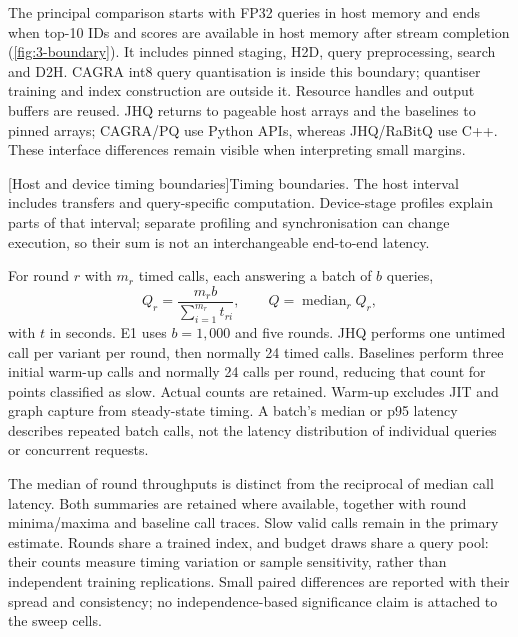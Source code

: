 The principal comparison starts with FP32 queries in host memory and ends
when top-10 IDs and scores are available in host memory after stream
completion (\cref{fig:3-boundary}). It includes pinned staging, H2D,
query preprocessing, search and D2H. CAGRA int8 query quantisation is inside
this boundary; quantiser training and index construction are outside it.
Resource handles and output buffers are reused. JHQ returns to pageable
host arrays and the baselines to pinned arrays; CAGRA/PQ use Python APIs,
whereas JHQ/RaBitQ use C++. These interface differences remain visible when
interpreting small margins.

\par\medskip\noindent\begin{minipage}{\linewidth}
\centering\captionsetup{hypcap=false}
\resizebox{\linewidth}{!}{}
[Host and device timing boundaries]{Timing boundaries. The host interval includes transfers and
query-specific computation. Device-stage profiles explain parts of that
interval; separate profiling and synchronisation can change execution, so
their sum is not an interchangeable end-to-end latency.}
\label{fig:3-boundary}
\end{minipage}\par\medskip

For round $r$ with $m_r$ timed calls, each answering a batch of $b$ queries,
\begin{equation}
Q_r=\frac{m_rb}{\sum_{i=1}^{m_r}t_{ri}},\qquad
Q=\operatorname{median}_r Q_r,
\label{eq:3-throughput}
\end{equation}
with $t$ in seconds. E1 uses $b=1{,}000$ and five rounds. JHQ performs
one untimed call per variant per round, then normally 24 timed calls.
Baselines perform three initial warm-up calls and normally 24 calls per
round, reducing that count for points classified as slow. Actual counts
are retained. Warm-up excludes JIT and graph capture from steady-state
timing. A batch's median or p95 latency describes repeated batch calls,
not the latency distribution of individual queries or concurrent requests.

The median of round throughputs is distinct from the reciprocal of median
call latency. Both summaries are retained where available, together with
round minima/maxima and baseline call traces. Slow valid calls remain in
the primary estimate. Rounds share a trained index, and budget draws share
a query pool: their counts measure timing variation or sample sensitivity,
rather than independent training replications. Small paired differences
are reported with their spread and consistency; no independence-based
significance claim is attached to the sweep cells.

